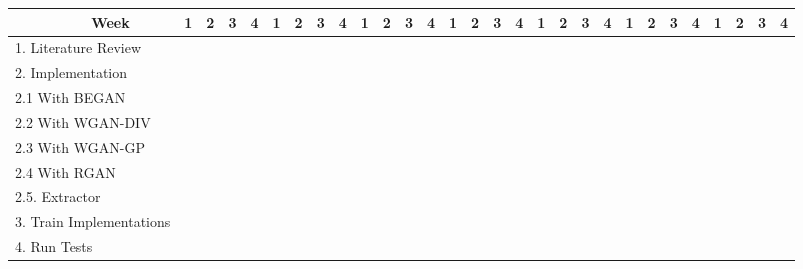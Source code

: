 \documentclass[../main/main.tex]{subfiles}
\begin{document}
\begin{table}[h!]
\begin{adjustbox}{angle=90, width=.75\textwidth}
\begin{tabular}{|c|c|c|c|c|c|c|c|c|c|c|c|c|c|c|c|c|c|c|c|c|c|c|c|c|c|c|c|c|c|}
				\cline{2-30}
				&Week & 1 & 2 & 3 & 4 & 1 & 2 & 3 & 4 & 1 & 2 & 3 & 4 & 1 & 2 & 3 & 4 & 1 & 2 & 3 & 4 & 1 & 2 & 3 & 4 & 1 & 2 & 3 & 4 \\
				\hline
				\multicolumn{2}{|l|}{1. Literature Review} &\cellcolor[HTML]{AA0044} &\cellcolor[HTML]{AA0044} &\cellcolor[HTML]{AA0044} &\cellcolor[HTML]{AA0044} &\cellcolor[HTML]{AA0044} &\cellcolor[HTML]{AA0044} &\cellcolor[HTML]{AA0044} &\cellcolor[HTML]{AA0044} &\cellcolor[HTML]{AA0044} &\cellcolor[HTML]{AA0044} &\cellcolor[HTML]{AA0044} &\cellcolor[HTML]{AA0044} &\cellcolor[HTML]{AA0044} &\cellcolor[HTML]{AA0044} &\cellcolor[HTML]{AA0044} &\cellcolor[HTML]{AA0044} &\cellcolor[HTML]{AA0044} &\cellcolor[HTML]{AA0044} &\cellcolor[HTML]{AA0044} &\cellcolor[HTML]{AA0044} &\cellcolor[HTML]{AA0044} &\cellcolor[HTML]{AA0044} &\cellcolor[HTML]{AA0044} &\cellcolor[HTML]{AA0044} & & & & \\
				\hline \hline
				\multicolumn{2}{|l|}{2. Implementation} & \cellcolor[HTML]{1111FF}&\cellcolor[HTML]{1111FF} &\cellcolor[HTML]{1111FF} &\cellcolor[HTML]{1111FF} &\cellcolor[HTML]{1111FF} & & & & & & & & & & & & & & & & & & & & & & & \\
				\hline 
				\multicolumn{2}{|l|}{ 2.1 With \gls{BEGAN}} & \cellcolor[HTML]{1111FF} & & & & & & & & & & & & & & & & & & & & & & & & & & & \\
				\hline
				\multicolumn{2}{|l|}{ 2.2 With \gls{WGAN-DIV}} & & \cellcolor[HTML]{1111FF} & & & & & & & & & & & & & & & & & & & & & & & & & & \\
				\hline
				\multicolumn{2}{|l|}{ 2.3 With \gls{WGAN-GP}} & & & \cellcolor[HTML]{1111FF} & & & & & & & & & & & & & & & & & & & & & & & & & \\
				\hline
				\multicolumn{2}{|l|}{ 2.4 With \gls{RGAN}} & & & &\cellcolor[HTML]{1111FF}  & & & & & & & & & & & & & & & & & & & & & & & & \\
				\hline
				\multicolumn{2}{|l|}{2.5. Extractor } & & & & &\cellcolor[HTML]{1111FF}  & & & & & & & & & & & & & & & & & & & & & & & \\
				\hline
				\hline
				\multicolumn{2}{|l|}{ 3. Train Implementations} & & & & & &\cellcolor[HTML]{BB11FF}  & \cellcolor[HTML]{BB11FF}& \cellcolor[HTML]{BB11FF}&\cellcolor[HTML]{BB11FF} & & & & & & & & & & & & & & & & & & & \\
				\hline
				\hline
				\multicolumn{2}{|l|}{ 4. Run Tests} & & & & & & & & & &\cellcolor[HTML]{AA6600}  &\cellcolor[HTML]{AA6600} &\cellcolor[HTML]{AA6600} &\cellcolor[HTML]{AA6600} &\cellcolor[HTML]{AA6600} &\cellcolor[HTML]{AA6600} &\cellcolor[HTML]{AA6600} & & & & & & & & & & & & \\

\end{tabular}
\end{adjustbox}
\end{table}
\end{document}
